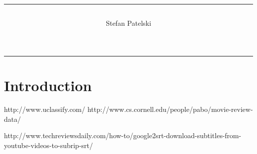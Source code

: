 \documentclass[a4paper,twoside,11pt]{article}
\title{\rule{\linewidth}{.75pt} \center{Title goes here}}
\author{Stefan Patelski}
\begin{document}
\maketitle
\vspace{-2\baselineskip}

\bigskip
\noindent\rule[2.5pt]{\textwidth}{0.75pt}

\newpage

\section{Introduction}



\begin{thebibliography}{1}
 http://www.uclassify.com/
   http://www.cs.cornell.edu/people/pabo/movie-review-data/
  
 http://www.techreviewsdaily.com/how-to/google2srt-download-subtitles-from-youtube-videos-to-subrip-srt/

  \end{thebibliography}
\end{document}
